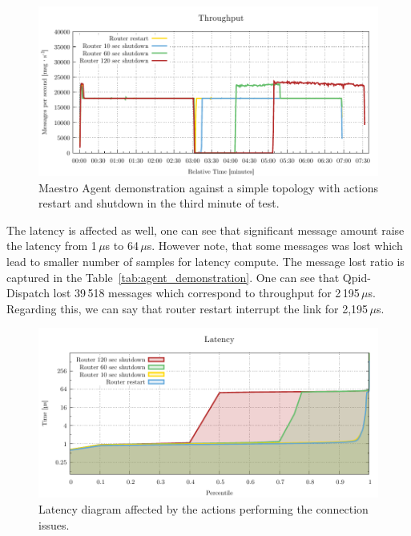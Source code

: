 \begin{figure}[H]
	\centering
	\includegraphics[width=1\linewidth]{obrazky-figures/charts/agent-throughput.pdf}
	\caption{Maestro Agent demonstration against a simple topology with actions restart and shutdown in the third minute of test.}
	\label{fig:agent-throughput}
\end{figure}

The latency is affected as well, one can see that significant message amount raise the latency from 1\,$\mu$s to 64\,$\mu$s. However note, that some messages was lost which lead to smaller number of samples for latency compute. The message lost ratio is captured in the Table~\ref{tab:agent_demonstration}. One can see that Qpid-Dispatch lost 39\,518 messages which correspond to throughput for 2\,195\,$\mu$s. Regarding this, we can say that router restart interrupt the link for 2,195\,$\mu$s.

\begin{figure}[H]
	\centering
	\includegraphics[width=1\linewidth]{obrazky-figures/charts/agent-latency.pdf}
	\caption{Latency diagram affected by the actions performing the connection issues.}
	\label{fig:agent-latency}
\end{figure}

